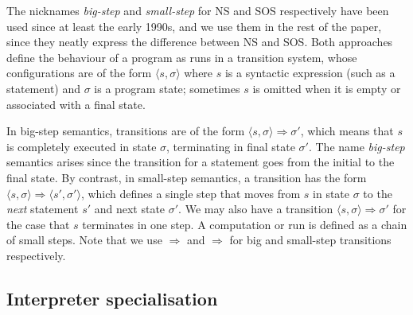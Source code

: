 \documentclass{llncs}
\begin{document}
The nicknames \emph{big-step} and \emph{small-step} for NS and SOS respectively have been used
since at least the early 1990s, and we use them in the rest of the paper, since they neatly
express the difference between NS and SOS.  Both approaches define the behaviour of a program
as runs in a transition system, whose configurations are of the form $\langle s, \sigma\rangle$ where $s$ is a
syntactic expression (such as a statement) and $\sigma$ is a program state; sometimes $s$ is omitted when it is empty
or associated with a final state.  

In big-step semantics, transitions are of the form $\langle s, \sigma\rangle \Longrightarrow \sigma'$, 
which means that $s$ is completely executed in state $\sigma$, terminating in final state $\sigma'$.
The name \emph{big-step} semantics arises since the transition for a statement goes from the initial to the final state.  
%
By contrast, in small-step semantics, a transition has the form $\langle s, \sigma\rangle \Rightarrow \langle s',\sigma'\rangle$, 
which defines a single step
that moves from $s$ in state $\sigma$ to the \emph{next} statement $s'$ and next state $\sigma'$. We may also have a transition
$\langle s, \sigma\rangle \Rightarrow \sigma'$ for the case that $s$ terminates in one step.
A computation or run is defined as a 
chain of small steps.  Note that we use $\Longrightarrow$ and $\Rightarrow$ for big and small-step transitions respectively.

\subsection{Interpreter specialisation}
\end{document}
